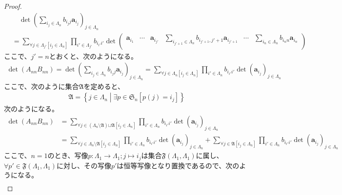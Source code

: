 \documentclass[dvipdfmx]{jsarticle}
\begin{document}
\begin{proof}
\begin{align*}
&\quad \det\left( \sum_{i_{j} \in \varLambda_{n}} {b_{i_{j}j}\mathbf{a}_{i_{j}}} \right)_{j \in \varLambda_{n}} \\
&= \sum_{\forall j \in \varLambda_{j'}\left[ i_{j} \in \varLambda_{n} \right]} {\prod_{i' \in \varLambda_{j'}} b_{i_{i'}i'}\det\begin{pmatrix}
\mathbf{a}_{i_{1}} & \cdots & \mathbf{a}_{i_{j'}} & \sum_{i_{j' + 1} \in \varLambda_{n}} {b_{i_{j' + 1},j' + 1}\mathbf{a}_{i_{j' + 1}}} & \cdots & \sum_{i_{n} \in \varLambda_{n}} {b_{i_{n}n}\mathbf{a}_{i_{n}}} \\
\end{pmatrix}}
\end{align*}
ここで、$j' = n$とおくと、次のようになる。
\begin{align*}
\det\left( A_{nn}B_{nn} \right) = \det\left( \sum_{i_{j} \in \varLambda_{n}} {b_{i_{j}j}\mathbf{a}_{i_{j}}} \right)_{j \in \varLambda_{n}} = \sum_{\forall j \in \varLambda_{n}\left[ i_{j} \in \varLambda_{n} \right]} {\prod_{i' \in \varLambda_{n}} b_{i_{i'}i'}\det\left( \mathbf{a}_{i_{j}} \right)_{j \in \varLambda_{n}}}
\end{align*}
ここで、次のように集合$\mathfrak{A}$を定めると、
\begin{align*}
\mathfrak{A} =\left\{ j \in \varLambda_{n} \middle| \exists p \in \mathfrak{S}_{n}\left[ p(j) = i_{j} \right] \right\}
\end{align*}
次のようになる。
\begin{align*}
\det\left( A_{nn}B_{nn} \right) &= \sum_{\forall j \in \left( \varLambda_{n}\mathfrak{\setminus A} \right)\mathfrak{\sqcup A}\left[ i_{j} \in \varLambda_{n} \right]} {\prod_{i' \in \varLambda_{n}} b_{i_{i'}i'}\det\left( \mathbf{a}_{i_{j}} \right)_{j \in \varLambda_{n}}}\\
&= \sum_{\forall j \in \varLambda_{n}\mathfrak{\setminus A}\left[ i_{j} \in \varLambda_{n} \right]} {\prod_{i' \in \varLambda_{n}} b_{i_{i'}i'}\det\left( \mathbf{a}_{i_{j}} \right)_{j \in \varLambda_{n}}} + \sum_{\forall j \in \mathfrak{A}\left[ i_{j} \in \varLambda_{n} \right]} {\prod_{i' \in \varLambda_{n}} b_{i_{i'}i'}\det\left( \mathbf{a}_{i_{j}} \right)_{j \in \varLambda_{n}}}
\end{align*}
ここで、$n = 1$のとき、写像$p:\varLambda_{1} \rightarrow \varLambda_{1};j \mapsto i_{j}$は集合$\mathfrak{F}\left( \varLambda_{1},\varLambda_{1} \right)$に属し、$\forall p'\in \mathfrak{F}\left( \varLambda_{1},\varLambda_{1} \right)$に対し、その写像$p'$は恒等写像となり置換であるので、次のようになる。
\begin{align*}

\end{align*}
\end{proof}
\end{document}

